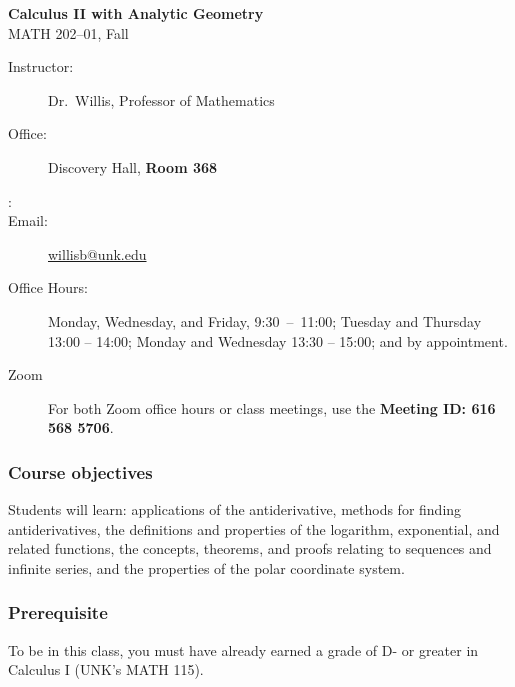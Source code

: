 \documentclass[12pt,fullpage]{article}
\newcounter{ex}\setcounter{ex}{0}
\newcommand{\term}{Fall }
\begin{document}
\large
\begin{center}
    \textbf{Calculus II with Analytic Geometry}  \\
    {MATH 202--01,  \term \the\year} \\
\end{center}

\vskip0.25in
\normalsize

\begin{center}
\begin{description}
    \item[Instructor:] Dr.\  Willis, Professor of Mathematics
    \item[Office:]  Discovery Hall,  \textbf{ Room 368}
    \item[\phone:]  
   \item[Email:] \href{mailto:willisb@unk.edu}{willisb@unk.edu}
   \item[Office Hours:] Monday, Wednesday, and  Friday, \mbox{9:30 -- 11:00}; Tuesday and Thursday 13:00 -- 14:00; Monday and Wednesday 13:30 -- 15:00;  and by appointment.

 \item[Zoom] For both Zoom office hours or class meetings, use the \textbf{Meeting ID: 616 568 5706}.
 \end{description}
\end{center}








\subsubsection*{Course objectives}


Students will learn: applications of the antiderivative, methods for finding antiderivatives, the definitions and properties of the logarithm, exponential, and related functions,
the concepts, theorems, and proofs relating to sequences and infinite series, and the properties of the polar coordinate system.


\subsubsection*{Prerequisite}

To be in this class, you must have already earned a grade of D- or  greater  in  Calculus I (UNK's MATH 115).
\end{document}
